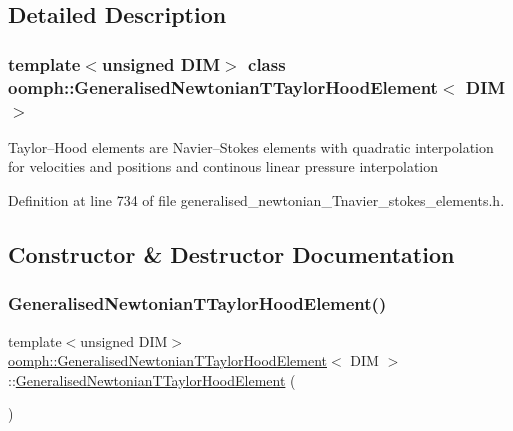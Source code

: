\subsection{Detailed Description}
\subsubsection*{template$<$unsigned D\+IM$>$\newline
class oomph\+::\+Generalised\+Newtonian\+T\+Taylor\+Hood\+Element$<$ D\+I\+M $>$}

Taylor--Hood elements are Navier--Stokes elements with quadratic interpolation for velocities and positions and continous linear pressure interpolation 

Definition at line 734 of file generalised\+\_\+newtonian\+\_\+\+Tnavier\+\_\+stokes\+\_\+elements.\+h.



\subsection{Constructor \& Destructor Documentation}
\mbox{\label{classoomph_1_1GeneralisedNewtonianTTaylorHoodElement_a80cba811e2e40c7f6747749899f2773e}} 
\subsubsection{\texorpdfstring{Generalised\+Newtonian\+T\+Taylor\+Hood\+Element()}{GeneralisedNewtonianTTaylorHoodElement()}\hspace{0.1cm}{\footnotesize\ttfamily [1/2]}}
{\footnotesize\ttfamily template$<$unsigned D\+IM$>$ \\
\hyperlink{classoomph_1_1GeneralisedNewtonianTTaylorHoodElement}{oomph\+::\+Generalised\+Newtonian\+T\+Taylor\+Hood\+Element}$<$ D\+IM $>$\+::\hyperlink{classoomph_1_1GeneralisedNewtonianTTaylorHoodElement}{Generalised\+Newtonian\+T\+Taylor\+Hood\+Element} (\begin{DoxyParamCaption}{ }\end{DoxyParamCaption})\hspace{0.3cm}{\ttfamily [inline]}}



